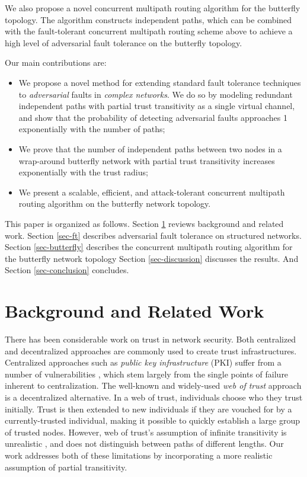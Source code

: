 \documentclass[twocolumn]{article}
\begin{document}
We also propose a novel concurrent multipath routing algorithm for the butterfly
topology.
The algorithm constructs independent paths,
which can be combined with the fault-tolerant concurrent multipath routing
scheme above to
achieve a high level of adversarial fault tolerance on the butterfly topology.

Our main contributions are:
\begin{itemize}
\item{
We propose a novel method for extending standard fault tolerance techniques to
{\em adversarial} faults in {\em complex networks}.
We do so by modeling redundant independent paths
with partial trust transitivity as a single virtual channel,
and show that the probability of detecting adversarial faults
approaches 1 exponentially with the number of paths;
}
\item{We prove that the number of independent paths between two nodes
in a wrap-around butterfly network with partial trust transitivity
increases exponentially with the trust radius;
}
\item{We present a scalable, efficient, and attack-tolerant concurrent
multipath routing algorithm on the butterfly network topology.}
\end{itemize}

This paper is organized as follows.
Section \ref{sec-related} reviews background and related work.
Section \ref{sec-ft} describes adversarial fault tolerance on
structured networks.
Section \ref{sec-butterfly} describes the concurrent multipath routing
algorithm for the butterfly network topology
Section \ref{sec-discussion} discusses the results.
And Section \ref{sec-conclusion} concludes.

\section{Background and Related Work}
\label{sec-related}

There has been considerable work on trust in network security.
Both centralized and decentralized approaches are commonly used to create
trust infrastructures.
Centralized approaches such as {\em public key infrastructure} (PKI)
suffer from a number of vulnerabilities
\cite{ellison_ten_2000},
which stem largely from the single points of failure inherent to
centralization.
The well-known and widely-used {\em web of trust} approach
\cite{zimmermann_official_1995,ferguson_practical_2003}
is a decentralized alternative.
In a web of trust,
individuals choose who they trust initially.
Trust is then extended to new individuals if they are vouched for by a
currently-trusted individual,
making it possible to quickly establish a large group of trusted nodes.
However, web of trust's assumption of infinite transitivity is unrealistic
\cite{christianson_why_1997},
and does not distinguish between paths of different lengths.
Our work addresses both of these limitations by incorporating a more realistic
assumption of partial transitivity.
\end{document}
